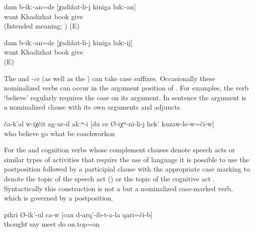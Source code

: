 %
\begin{exe}
		\ex	\label{ex:‎I wanted to give the book to Khadizhat1}
	\gll	* dam	b-ikː-an=de	[χadižat-li-j	kiniga	lukː-an]\\
		{} 	want	Khadizhat	book	give\\
	\glt	(Intended meaning: ) (E)
	
			\ex	\label{ex:‎I wanted to give the book to Khadizhat2}
	\gll	dam	b-ikː-an=de	[χadižat-li-j	kiniga	lukː-ij]\\
		 	want	Khadizhat	book	give\\
	\glt	{} (E)
\end{exe}

The   and -\textit{ce} (as well as the ) can take case suffixes. Occasionally these nominalized verbs can occur in the argument position of . For examples, the verb `believe' regularly requires the  case on its  argument. In sentence  the  argument is a nominalized clause with its own arguments and adjuncts.

%
\begin{exe}
	\ex	\label{ex:‎Nobody believed what had happened to me, there up on the coachwork}
	\gll	ča-k'al	w-iχčit	ag-ur-il	akːʷ-i	[du	ce	Ø-iχʷ-ni-li-j	hek'	kuzaw-le-w=či-w]\\
		who	believe	go			what	be		coachworkon\\
	\glt	{}
\end{exe}

For the  and cognition verbs whose complement clauses denote speech acts or similar types of activities that require the use of language it is possible to use the postposition  followed by a participial clause with the appropriate case marking to denote the topic of the speech act () or the topic of the cognitive act . Syntactically this construction is not a  but a nominalized case-marked verb, which is governed by a postposition.  
%
\begin{exe}
	\ex	\label{ex:He thinks about what he had done}
	\gll	pikri	Ø-ik'-ul	ca-w	[can	d-arq'-ib-t-a-la	qari=či-b]\\
		thought	say		meet	do	on.top=on\\
	\glt	{}
\end{exe}

